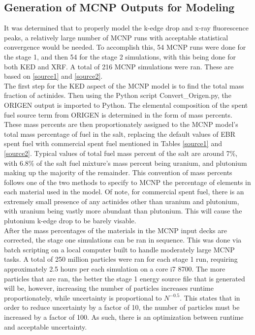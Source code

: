 \subsection{Generation of MCNP Outputs for Modeling}

It was determined that to properly model the k-edge drop and x-ray fluorescence peaks, a relatively large number of MCNP runs with acceptable statistical convergence would be needed. To accomplish this, 54 MCNP runs were done for the stage 1, and then 54 for the stage 2 simulations, with this being done for both KED and XRF. A total of 216 MCNP simulations were ran. These are based on \ref{source1} and \ref{source2}. \\

The first step for the KED aspect of the MCNP model is to find the total mass fraction of actinides. Then using the Python script Convert\_Origen.py, the ORIGEN output is imported to Python. The elemental composition of the spent fuel source term from ORIGEN is determined in the form of mass percents. These mass percents are then proportionately assigned to the MCNP model's total mass percentage of fuel in the salt, replacing the default values of EBR spent fuel with commercial spent fuel mentioned in Tables \ref{source1} and \ref{source2}. Typical values of total fuel mass percent of the salt are around 7\%, with 6.8\% of the salt fuel mixture's mass percent being uranium, and plutonium making up the majority of the remainder. This convention of mass percents follows one of the two methods to specify to MCNP the percentage of elements in each material used in the model. Of note, for commercial spent fuel, there is an extremely small presence of any actinides other than uranium and plutonium, with uranium being vastly more abundant than plutonium. This will cause the plutonium k-edge drop to be barely visable. \\ %

After the mass percentages of the materials in the MCNP input decks are corrected, the stage one simulations can be ran in sequence. This was done via batch scripting on a local computer built to handle moderately large MCNP tasks. A total of 250 million particles were ran for each stage 1 run, requiring approximately 2.5 hours per each simulation on a core i7 8700. The more particles that are ran, the better the stage 1 energy source file that is generated will be, however, increasing the number of particles increases runtime proportionately, while uncertainty is proportional to ${N^{-0.5}}$. This states that in order to reduce uncertainty by a factor of 10, the number of particles must be increased by a factor of 100. As such, there is an optimization between runtime and acceptable uncertainty. \\

